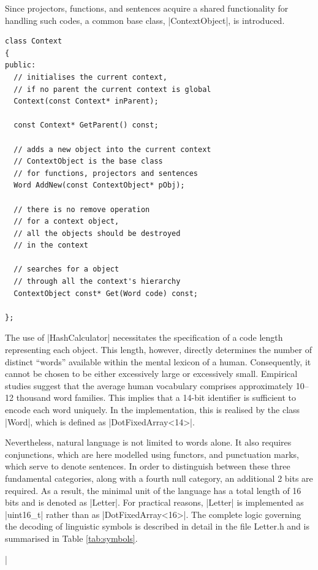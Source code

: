 \documentclass[12pt, a4paper]{article}
\begin{document}
Since projectors, functions, and sentences acquire a shared functionality for handling 
such codes, a common base class, |ContextObject|, is introduced.


\begin{lstlisting}[caption=Context]
class Context
{
public:
  // initialises the current context, 
  // if no parent the current context is global
  Context(const Context* inParent);

  const Context* GetParent() const;

  // adds a new object into the current context
  // ContextObject is the base class 
  // for functions, projectors and sentences
  Word AddNew(const ContextObject* pObj);

  // there is no remove operation 
  // for a context object, 
  // all the objects should be destroyed 
  // in the context

  // searches for a object 
  // through all the context's hierarchy
  ContextObject const* Get(Word code) const;

};
\end{lstlisting}

The use of |HashCalculator| necessitates the specification of a code length representing 
each object. This length, however, directly determines the number of distinct ``words'' 
available within the mental lexicon of a human. Consequently, it cannot be chosen to 
be either excessively large or excessively small. Empirical studies suggest that the 
average human vocabulary comprises approximately 10–12 thousand word 
families\cite{Brysbaert2016-om}. This implies that a 14-bit identifier is sufficient 
to encode each word uniquely. In the implementation, this is realised by the class 
|Word|, which is defined as |DotFixedArray<14>|.

Nevertheless, natural language is not limited to words alone. It also requires conjunctions, 
which are here modelled using functors, and punctuation marks, which serve to denote 
sentences. In order to distinguish between these three fundamental categories, along 
with a fourth null category, an additional 2 bits are required. As a result, the minimal 
unit of the language has a total length of 16 bits and is denoted as |Letter|. For practical 
reasons, |Letter| is implemented as |uint16_t| rather than as |DotFixedArray<16>|. 
The complete logic governing the decoding of linguistic symbols is described in detail 
in the file Letter.h and is summarised in Table \ref{tab:symbols}.

\lstDeleteShortInline|
\end{document}
